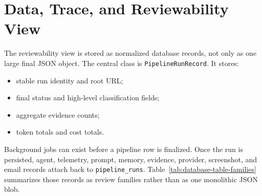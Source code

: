 \section{Data, Trace, and Reviewability View}

The reviewability view is stored as normalized database records, not only as one large
final JSON object. The central class is \texttt{PipelineRunRecord}. It stores:
\begin{itemize}
  \item stable run identity and root URL;
  \item final status and high-level classification fields;
  \item aggregate evidence counts;
  \item token totals and cost totals.
\end{itemize}

Background jobs can exist before a pipeline row is finalized. Once the run is
persisted, agent, telemetry, prompt, memory, evidence, provider, screenshot, and email
records attach back to \texttt{pipeline\_runs}. Table~\ref{tab:database-table-families}
summarizes those records as review families rather than as one monolithic JSON blob.

